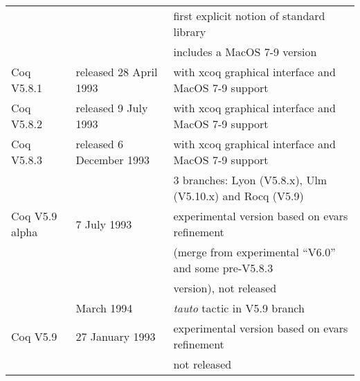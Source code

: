 \documentclass[a4paper]{book}
\newcommand{\feature}[1]{{\em #1}}
\begin{document}
\begin{tabular}{l|l|l}
& & first explicit notion of standard library\\

& & includes a MacOS 7-9 version\\

Coq V5.8.1& released 28 April 1993 & with xcoq graphical interface and MacOS 7-9 support\\

Coq V5.8.2& released 9 July 1993 & with xcoq graphical interface and MacOS 7-9 support\\

Coq V5.8.3& released 6 December 1993 %
          & with xcoq graphical interface and MacOS 7-9 support\\

 & & 3 branches: Lyon (V5.8.x), Ulm (V5.10.x) and Rocq (V5.9)\\

Coq V5.9 alpha& 7 July 1993 & 
experimental version based on evars refinement \\
              & & (merge from experimental ``V6.0'' and some pre-V5.8.3 \\
              & & version), not released\\

& March 1994 & \feature{tauto} tactic in V5.9 branch\\

Coq V5.9 & 27 January 1993 & experimental version based on evars refinement\\
         & & not released\\
\end{tabular}

\bigskip
\bigskip


\newpage
\end{document}
